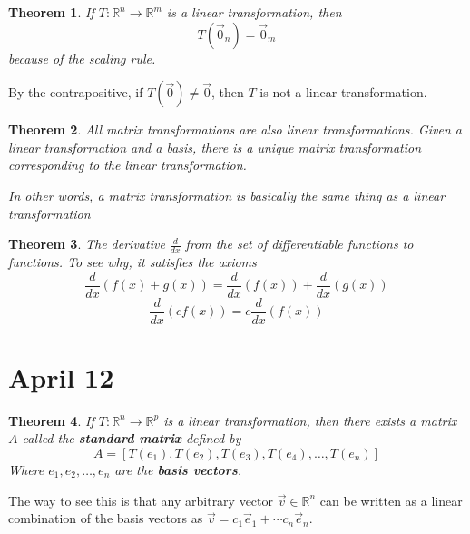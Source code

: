 \documentclass[11pt]{article}
\newtheorem{thm}{Theorem}
\begin{document}
\begin{thm}
  If $T: \mathbb{R}^{n} \to \mathbb{R}^{m}$  is a linear transformation, then
  \[T(\vec{0}_{n}) = \vec{0}_{m}\]
  because of the scaling rule.
\end{thm}

By the contrapositive, if $T(\vec{0}) \neq \vec{0}$, then $T$ is not a linear transformation.

\begin{thm}
  All matrix transformations are also linear transformations. Given a linear transformation and a basis, there is a unique matrix transformation corresponding to
  the linear transformation.

  In other words, a matrix transformation is basically the same thing as a linear transformation
\end{thm}

\begin{thm}
  The derivative $\frac{d}{dx}$ from the set of differentiable functions to functions. To see why, it satisfies the axioms
  \[\frac{d}{dx}(f(x) + g(x)) = \frac{d}{dx}(f(x)) + \frac{d}{dx}(g(x))\]
  \[\frac{d}{dx}(c f(x)) = c \frac{d}{dx}(f(x))\]
\end{thm}
\section{April 12}

\begin{thm}
  If $ T : \mathbb{R}^{n} \to \mathbb{R}^{p}$ is a linear transformation, then there exists a matrix $A$ called the
  \textbf{standard matrix} defined by
  \[A = [T(e_{1}), T(e_{2}), T(e_{3}), T(e_{4}), \ldots, T(e_{n})]\]
  Where $e_{1}, e_{2}, \ldots, e_{n}$ are the \textbf{basis vectors}.
\end{thm}


The way to see this is that any arbitrary vector $\vec{v} \in \mathbb{R}^{n}$ can be written as a linear combination of the basis vectors as
$\vec{v} = c_{1}\vec{e}_{1} + \cdots c_{n}\vec{e}_{n}$.
\end{document}

